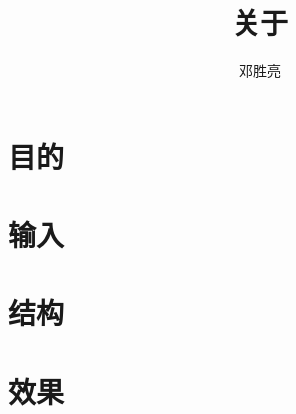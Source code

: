 \documentclass[UTF8]{article}
\title{关于}
\author{邓胜亮}
\begin{document}
  \maketitle
  \section{目的}
    
  \section{输入}
  \section{结构}
  \section{效果}
\end{document}
